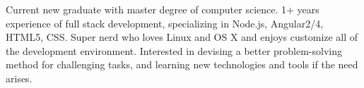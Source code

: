 

\begin{cvparagraph}

Current new graduate with master degree of computer science. 1+ years experience of full stack development, specializing in Node.js, Angular2/4, HTML5, CSS. Super nerd who loves Linux and OS X and enjoys customize all of the development environment. Interested in devising a better problem-solving method for challenging tasks, and learning new technologies and tools if the need arises.
\end{cvparagraph}
